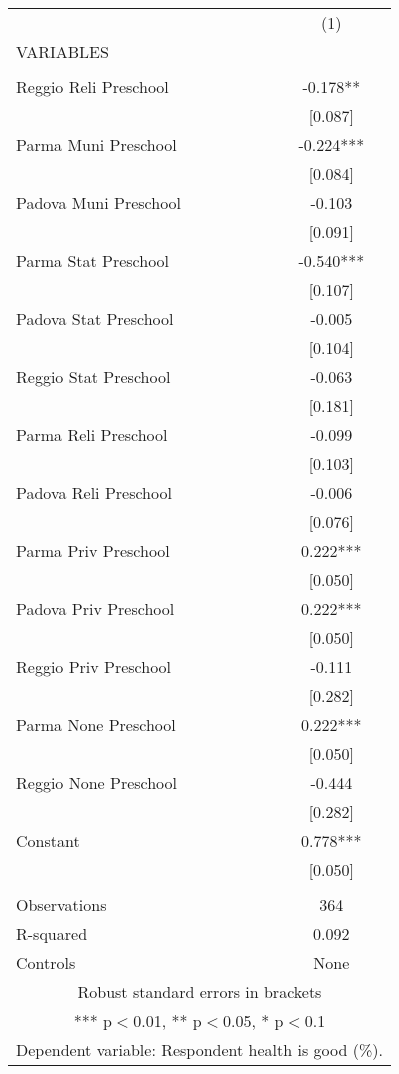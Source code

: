 \begin{tabular}{lc} \hline
 & (1) \\
VARIABLES &  \\ \hline
 &  \\
Reggio Reli Preschool & -0.178** \\
 & [0.087] \\
Parma Muni Preschool & -0.224*** \\
 & [0.084] \\
Padova Muni Preschool & -0.103 \\
 & [0.091] \\
Parma Stat Preschool & -0.540*** \\
 & [0.107] \\
Padova Stat Preschool & -0.005 \\
 & [0.104] \\
Reggio Stat Preschool & -0.063 \\
 & [0.181] \\
Parma Reli Preschool & -0.099 \\
 & [0.103] \\
Padova Reli Preschool & -0.006 \\
 & [0.076] \\
Parma Priv Preschool & 0.222*** \\
 & [0.050] \\
Padova Priv Preschool & 0.222*** \\
 & [0.050] \\
Reggio Priv Preschool & -0.111 \\
 & [0.282] \\
Parma None Preschool & 0.222*** \\
 & [0.050] \\
Reggio None Preschool & -0.444 \\
 & [0.282] \\
Constant & 0.778*** \\
 & [0.050] \\
 &  \\
Observations & 364 \\
R-squared & 0.092 \\
 Controls & None \\ \hline
\multicolumn{2}{c}{ Robust standard errors in brackets} \\
\multicolumn{2}{c}{ *** p$<$0.01, ** p$<$0.05, * p$<$0.1} \\
\multicolumn{2}{c}{ Dependent variable: Respondent health is good (\%).} \\
\end{tabular}
